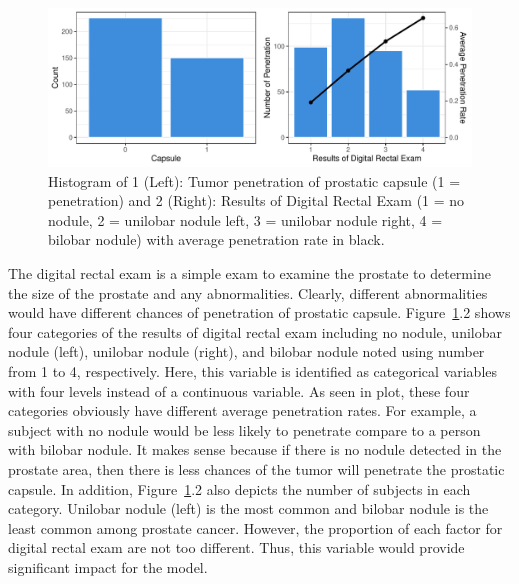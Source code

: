 \documentclass[11pt]{article}\usepackage[]{graphicx}\usepackage[]{color}
\makeatletter
\def\maxwidth{ %
  \ifdim\Gin@nat@width>\linewidth
    \linewidth
  \else
    \Gin@nat@width
  \fi
}
\makeatother
\begin{document}
\begin{figure}[h!] 
\begin{center}

\includegraphics[width=\maxwidth]{figure/unnamed-chunk-1-1} 

\caption{Histogram of 1 (Left): Tumor penetration of prostatic capsule (1 = penetration) and 2 (Right): Results of Digital Rectal Exam (1 = no nodule, 2 = unilobar nodule left, 3 = unilobar nodule right, 4 = bilobar nodule) with average penetration rate in black.}
\label{explore1}
\end{center} 
\end{figure}

\noindent The digital rectal exam is a simple exam to examine the prostate to determine the size of the prostate and any abnormalities. Clearly, different abnormalities would have different chances of penetration of prostatic capsule. Figure~\ref{explore1}.2 shows four categories of the results of digital rectal exam including no nodule, unilobar nodule (left), unilobar nodule (right), and bilobar nodule noted using number from 1 to 4, respectively. Here, this variable is identified as categorical variables with four levels instead of a continuous variable. As seen in plot, these four categories obviously have different average penetration rates. For example, a subject with no nodule would be less likely to penetrate compare to a person with bilobar nodule. It makes sense because if there is no nodule detected in the prostate area, then there is less chances of the tumor will penetrate the prostatic capsule. In addition, Figure~\ref{explore1}.2 also depicts the number of subjects in each category. Unilobar nodule (left) is the most common and bilobar nodule is the least common among prostate cancer. However, the proportion of each factor for digital rectal exam are not too different. Thus, this variable would provide significant impact for the model.   
\hfill \break
\end{document}
